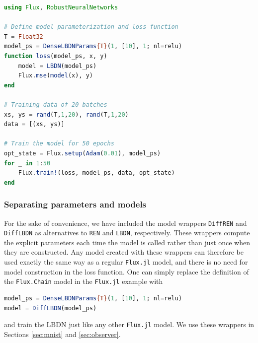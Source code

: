 \begin{lstlisting}[language = Julia]
using Flux, RobustNeuralNetworks

# Define model parameterization and loss function
T = Float32
model_ps = DenseLBDNParams{T}(1, [10], 1; nl=relu)
function loss(model_ps, x, y) 
    model = LBDN(model_ps)
    Flux.mse(model(x), y)
end

# Training data of 20 batches
xs, ys = rand(T,1,20), rand(T,1,20)
data = [(xs, ys)]

# Train the model for 50 epochs
opt_state = Flux.setup(Adam(0.01), model_ps)
for _ in 1:50
    Flux.train!(loss, model_ps, data, opt_state)
end
\end{lstlisting}

\subsubsection{Separating parameters and models} \label{sec:separate-params}

For the sake of convenience, we have included the model wrappers \verb|DiffREN| and \verb|DiffLBDN| as alternatives to \verb|REN| and \verb|LBDN|, respectively. These wrappers compute the explicit parameters each time the model is called rather than just once when they are constructed. Any model created with these wrappers can therefore be used exactly the same way as a regular \verb|Flux.jl| model, and there is no need for model construction in the loss function. One can simply replace the definition of the \verb|Flux.Chain| model in the \verb|Flux.jl| example with
\begin{lstlisting}[language = Julia]
model_ps = DenseLBDNParams{T}(1, [10], 1; nl=relu)
model = DiffLBDN(model_ps)
\end{lstlisting}
and train the LBDN just like any other \verb|Flux.jl| model. We use these wrappers in Sections \ref{sec:mnist} and \ref{sec:observer}.

